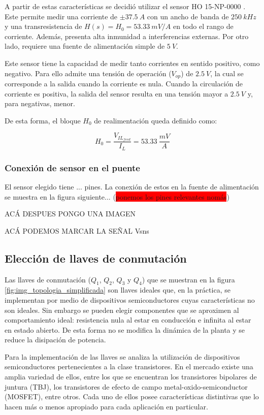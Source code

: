 A partir de estas características se decidió utilizar el sensor HO 15-NP-0000 \cite{HO15-NP}. Este permite medir una corriente de $\pm 37.5\:A$ con un ancho de banda de $250\:kHz$ y una transresistencia de $H(s)=H_0=53.33\:mV/A$ en todo  el rango de corriente. Además, presenta alta inmunidad a interferencias externas. Por otro lado, requiere una fuente de alimentación simple de $5\:V$.

Este sensor tiene la capacidad de medir tanto corrientes en sentido positivo, como negativo. Para ello admite una tensión de operación ($V_{op}$) de $2.5\:V$, la cual se corresponde a la salida cuando la corriente es nula. Cuando la circulación de corriente es positiva, la salida del sensor resulta en una tensión mayor a $2.5\:V$ y, para negativas, menor.

De esta forma, el bloque $H_0$ de realimentación queda definido como:

\begin{equation}
	H_0=\frac{V_{IL_{feed}}}{I_L}=53.33 \:\frac{mV}{A}
\end{equation}

\subsubsection{Conexión de sensor en el puente}

El sensor elegido tiene ... pines. La conexión de estos en la fuente de alimentación se muestra en la figura siguiente... (\colorbox{red}{ponemos los pines relevantes nomás})

ACÁ DESPUES PONGO UNA IMAGEN

ACÁ PODEMOS MARCAR LA SEÑAL Vsns

\subsection{Elección de llaves de conmutación} \label{sec_eleccion_llaves}

Las llaves de conmutación ($Q_1$, $Q_2$, $Q_3$ y $Q_4$) que se muestran en la figura \ref{fig:img_topologia_simplificada} son llaves ideales que, en la práctica, se implementan por medio de dispositivos semiconductores cuyas características no son ideales. Sin embargo se pueden elegir componentes que se aproximen al comportamiento ideal: resistencia nula al estar en conducción e infinita al estar en estado abierto. De esta forma no se modifica la dinámica de la planta y se reduce la disipación de potencia.

Para la implementación de las llaves se analiza la utilización de dispositivos semiconductores pertenecientes a la clase transistores. En el mercado existe una amplia variedad de ellos, entre los que se encuentran los transistores bipolares de juntura (TBJ), los transistores de efecto de campo metal-oxido-semiconductor (MOSFET), entre otros. Cada uno de ellos posee características distintivas que lo hacen más o menos apropiado para cada aplicación en particular. 

